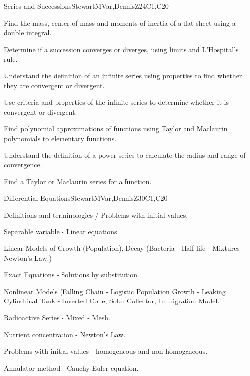 \begin{syllabus}
\begin{unit}{Series and Successions}{}{StewartMVar,DennisZ}{24}{C1,C20}
   \begin{learningoutcomes}
    \item Find the mass, center of mass and moments of inertia of a flat sheet using a double integral.
    \item Determine if a succession converges or diverges, using limits and L'Hospital's rule.
    \item Understand the definition of an infinite series using properties to find whether they are convergent or divergent.
    \item Use criteria and properties of the infinite series to determine whether it is convergent or divergent.
    \item Find polynomial approximations of functions using Taylor and Maclaurin polynomials to elementary functions.
    \item Understand the definition of a power series to calculate the radius and range of convergence.
    \item Find a Taylor or Maclaurin series for a function.
     \end{learningoutcomes}
\end{unit}

\begin{unit}{Differential Equations}{}{StewartMVar,DennisZ}{30}{C1,C20}
   \begin{topics}
    \item Definitions and terminologies / Problems with initial values.
    \item Separable variable - Linear equations.
    \item Linear Models of Growth (Population), Decay (Bacteria - Half-life - Mixtures - Newton's Law.)
    \item Exact Equations - Solutions by substitution.
    \item Nonlinear Models (Falling Chain - Logistic Population Growth - Leaking Cylindrical Tank - Inverted Cone, Solar Collector, Immigration Model.
    \item Radioactive Series - Mixed - Mesh.
    \item Nutrient concentration - Newton's Law.
    \item Problems with initial values - homogeneous and non-homogeneous.
    \item Annulator method - Cauchy Euler equation.
      \end{topics}


\end{unit}
\end{syllabus}
